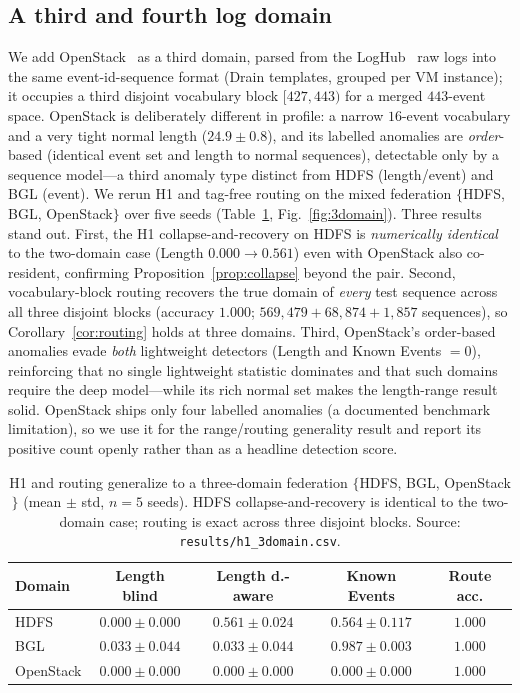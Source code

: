 \documentclass[journal]{IEEEtran}
\begin{document}
\subsection{A third and fourth log domain}\label{sec:3domain}
We add OpenStack~\cite{du2017deeplog} as a third domain, parsed from the LogHub~\cite{zhu2023loghub}
raw logs into the same event-id-sequence format (Drain templates, grouped per VM instance); it occupies
a third disjoint vocabulary block $[427,443)$ for a merged $443$-event space. OpenStack is deliberately
different in profile: a narrow $16$-event vocabulary and a very tight normal length ($24.9\pm0.8$), and
its labelled anomalies are \emph{order}-based (identical event set and length to normal sequences),
detectable only by a sequence model---a third anomaly type distinct from HDFS (length/event) and BGL
(event). We rerun H1 and tag-free routing on the mixed federation $\{$HDFS, BGL, OpenStack$\}$ over five
seeds (Table~\ref{tab:3domain}, Fig.~\ref{fig:3domain}). Three results stand out. First, the H1 collapse-and-recovery on HDFS is
\emph{numerically identical} to the two-domain case (Length $0.000\rightarrow0.561$) even with OpenStack
also co-resident, confirming Proposition~\ref{prop:collapse} beyond the pair. Second, vocabulary-block
routing recovers the true domain of \emph{every} test sequence across all three disjoint blocks
(accuracy $1.000$; $569{,}479+68{,}874+1{,}857$ sequences), so Corollary~\ref{cor:routing} holds at
three domains. Third, OpenStack's order-based anomalies evade \emph{both} lightweight detectors (Length
and Known Events $=0$), reinforcing that no single lightweight statistic dominates and that such domains
require the deep model---while its rich normal set makes the length-range result solid. OpenStack ships
only four labelled anomalies (a documented benchmark limitation), so we use it for the range/routing
generality result and report its positive count openly rather than as a headline detection score.

\begin{table}[t]
\caption{H1 and routing generalize to a three-domain federation $\{$HDFS, BGL, OpenStack$\}$
(mean $\pm$ std, $n=5$ seeds). HDFS collapse-and-recovery is identical to the two-domain case; routing
is exact across three disjoint blocks. Source: \texttt{results/h1\_3domain.csv}.}
\label{tab:3domain}
\centering
\begin{tabular}{@{}lcccc@{}}
\toprule
Domain & Length blind & Length d.-aware & Known Events & Route acc. \\
\midrule
HDFS      & $0.000\pm0.000$ & $\mathbf{0.561\pm0.024}$ & $0.564\pm0.117$ & $1.000$ \\
BGL       & $0.033\pm0.044$ & $0.033\pm0.044$ & $0.987\pm0.003$ & $1.000$ \\
OpenStack & $0.000\pm0.000$ & $0.000\pm0.000$ & $0.000\pm0.000$ & $1.000$ \\
\bottomrule
\end{tabular}
\end{table}
\end{document}
